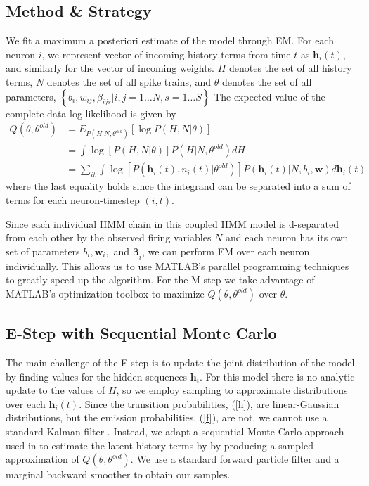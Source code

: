 \documentclass{article}
\begin{document}
\subsection{Method \& Strategy}
We fit a maximum a posteriori estimate of the model through EM.  For
each neuron $i$, we represent vector of incoming history terms from
time $t$ as $\mathbf{h}_i(t)$, and similarly for the vector of
incoming weights. $H$ denotes the set of all history terms, $N$
denotes the set of all spike trains, and $\theta$ denotes the set
of all parameters,
$\left\{ b_i, w_{ij}, \beta_{ijs} | i,j = 1 \ldots N, s = 1 \ldots S \right\}$
The expected value of the complete-data log-likelihood is given by
\begin{align*} \label{Q}  
Q(\theta,\theta^{old}) &= E_{P(H|N,\theta^{old})} \left[ \log{P(H,N|\theta)} \right] 
\\                     &= \int{ \log\left[P(H,N|\theta)\right] P(H|N,\theta^{old}) dH }
\\                     &= \sum_{it} \int \log\left[P(\mathbf{h}_i(t),n_i(t)|\theta^{old})\right] P(\mathbf{h}_i(t)|N,b_i,\mathbf{w}) d\mathbf{h}_i(t)
\end{align*}
where the last equality holds since the integrand can be separated
into a sum of terms for each neuron-timestep $(i,t)$.

Since each individual HMM chain in this coupled HMM model is d-separated from each other by the observed firing variables $N$ and each neuron has its own set of parameters  $b_i, \mathbf w_i,$ and $\bm{\beta}_i$, we can perform EM over each neuron individually. This allows us to use MATLAB's parallel programming techniques to greatly speed up the algorithm. For the M-step we take advantage of MATLAB's optimization toolbox to maximize $Q(\theta,\theta^{old})$ over $\theta$.

\subsection{E-Step with Sequential Monte Carlo}

The main challenge of the E-step is to update the joint distribution of the model by finding values for the hidden sequences $\mathbf{h}_i$. For this model there is no analytic update to the values of $H$, so we employ sampling to approximate distributions over each $\mathbf{h}_i(t)$. Since the transition probabilities, (\ref{h}), are linear-Gaussian distributions,
but the emission probabilities, (\ref{f}), are not, we cannot
use a standard Kalman filter \citep{bishop}.  Instead, we adapt a
sequential Monte Carlo approach used in \citep{volgelstein2009,
mishchencko2011} to estimate the latent history terms by
by producing a sampled approximation of $Q(\theta,\theta^{old})$. We
use a standard forward particle filter \citep{bishop} and a marginal
backward smoother \citep{doucet2000} to obtain our samples.
\end{document}

